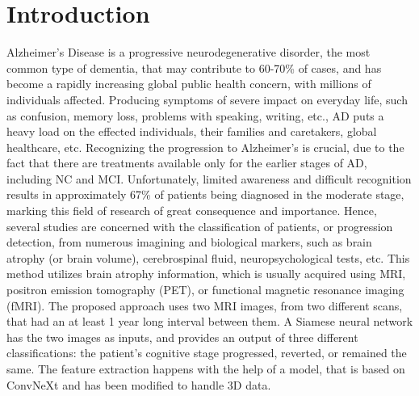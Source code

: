 \documentclass[journal]{IEEEtran}
\begin{document}
\section{Introduction}
% 
% 
% 
% 
Alzheimer's Disease is a progressive neurodegenerative disorder, the most common type of dementia, that may contribute to 60-70\% of cases, and has become a rapidly increasing global public health concern, with millions of individuals affected. Producing symptoms of severe impact on everyday life, such as confusion, memory loss, problems with speaking, writing, etc., AD puts a heavy load on the effected individuals, their families and caretakers, global healthcare, etc. \cite{1} \cite{2} Recognizing the progression to Alzheimer's is crucial, due to the fact that there are treatments available only for the earlier stages of AD, including NC and MCI. \cite{3} Unfortunately, limited awareness and difficult recognition results in approximately 67\% of patients being diagnosed in the moderate stage, marking this field of research of great consequence and importance. \cite{4} Hence, several studies are concerned with the classification of patients, or progression detection, from numerous imagining and biological markers, such as brain atrophy (or brain volume), cerebrospinal fluid, neuropsychological tests, etc. \cite{5} \cite{6} This method utilizes brain atrophy information, which is usually acquired using MRI, positron emission tomography (PET), or functional magnetic resonance imaging (fMRI). The proposed approach uses two MRI images, from two different scans, that had an at least 1 year long interval between them. A Siamese neural network has the two images as inputs,  and provides an output of three different classifications: the patient's cognitive stage progressed, reverted,  or remained the same. The feature extraction happens with the help of a model, that is based on ConvNeXt and has been modified to handle 3D data.
\end{document}
